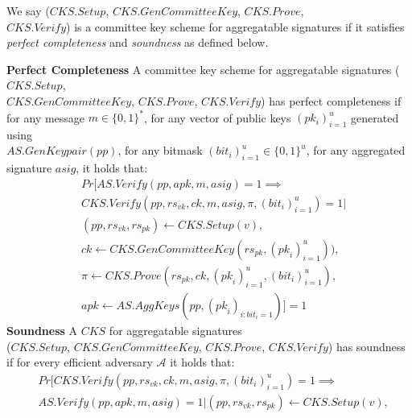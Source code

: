 \begin{definition}
\noindent We say ($\mathit{CKS.Setup}$, $\mathit{CKS.GenCommitteeKey}$, $\mathit{CKS.Prove}$, \\$\mathit{CKS.Verify}$) 
is a committee key scheme for aggregatable signatures if it satisfies \emph{perfect completeness} and 
\emph{soundness} as defined below.

\vspace{-0.1cm}
\noindent \textbf{Perfect Completeness} A committee key scheme for aggregatable signatures 
($\mathit{CKS.Setup}$, \\ $\mathit{CKS.GenCommitteeKey}$, $\mathit{CKS.Prove}$, $\mathit{CKS.Verify}$)
has perfect completeness if for any message $m \in \{0,1\}^*$, 
for any vector of public keys $(\mathit{pk_i})_{i=1}^{u}$ generated using \\ $\mathit{AS.GenKeypair}(\mathit{pp})$, 
for any bitmask $(\mathit{bit_i})_{i=1}^{u} \in \{0,1\}^u$,  for any aggregated signature $\mathit{asig}$, 
it holds that: 
\vspace{-0.1cm}
\begin{align*}
& \mathit{Pr}[\mathit{AS.Verify}(\mathit{pp}, \mathit{apk}, m, \mathit{asig}) = 1 \implies \\
&\mathit{CKS.Verify}(\mathit{pp}, \mathit{rs}_{\mathit{vk}}, \mathit{ck}, m, \mathit{asig}, \pi, (\mathit{bit}_{i})_{i=1}^u) =1 | \\
& (\mathit{pp}, \mathit{rs}_{\mathit{vk}}, \mathit{rs}_{\mathit{pk}}) \leftarrow 
\mathit{CKS.Setup}(v), \\ 
&\mathit{ck} \leftarrow \mathit{CKS.GenCommitteeKey}(\mathit{rs}_{\mathit{pk}}, (\mathit{pk}_{i})_{i=1}^u)), \\
& \pi \leftarrow \mathit{CKS.Prove}(\mathit{rs}_{\mathit{pk}}, \mathit{ck}, (\mathit{pk}_{i})_{i=1}^u, (\mathit{bit_i})_{i=1}^u), \\
&\mathit{apk} \leftarrow \mathit{AS.AggKeys}(\mathit{pp}, (\mathit{pk}_{i})_{i:\mathit{bit_i}=1})]=1
\end{align*} 
\vspace{-0.08cm}
\noindent \textbf{Soundness} A $\mathit{CKS}$ for aggregatable signatures \\
($\mathit{CKS.Setup}$, $\mathit{CKS.GenCommitteeKey}$, $\mathit{CKS.Prove}$, $\mathit{CKS.Verify}$)
has soundness if for every efficient adversary $\mathcal{A}$ it holds that: 
\begin{align*}
&\mathit{Pr}[\mathit{CKS.Verify}(\mathit{pp}, \mathit{rs}_{\mathit{vk}}, \mathit{ck}, m,  \mathit{asig}, \pi, (\mathit{bit}_{i})_{i=1}^u) =1 
 \implies \\ & \mathit{AS.Verify}(\mathit{pp}, \mathit{apk}, m, \mathit{asig}) = 1  |  (\mathit{pp}, \mathit{rs}_{\mathit{vk}},\mathit{rs}_{\mathit{pk}}) \leftarrow \mathit{CKS.Setup}(v),\\

\end{align*}
\end{definition}
